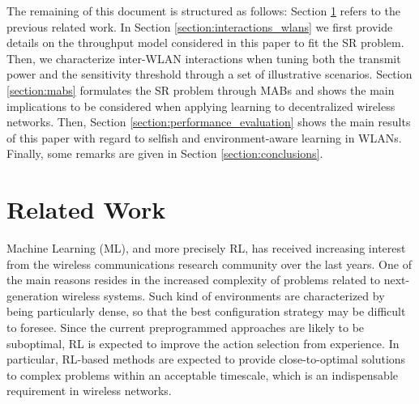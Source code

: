 \documentclass[preprint,12pt]{elsarticle}
\begin{document}
The remaining of this document is structured as follows: Section \ref{section:previous_work} refers to the previous related work. In Section \ref{section:interactions_wlans} we first provide details on the throughput model considered in this paper to fit the SR problem. Then, we characterize inter-WLAN interactions when tuning both the transmit power and the sensitivity threshold through a set of illustrative scenarios. Section \ref{section:mabs} formulates the SR problem through MABs and shows the main implications to be considered when applying learning to decentralized wireless networks. Then, Section \ref{section:performance_evaluation} shows the main results of this paper with regard to selfish and environment-aware learning in WLANs. Finally, some remarks are given in Section \ref{section:conclusions}.

\section{Related Work}
\label{section:previous_work} 		
Machine Learning (ML), and more precisely RL, has received increasing interest from the wireless communications research community over the last years. One of the main reasons resides in the increased complexity of problems related to next-generation wireless systems. Such kind of environments are characterized by being particularly dense, so that the best configuration strategy may be difficult to foresee. Since the current preprogrammed approaches are likely to be suboptimal, RL is expected to improve the action selection from experience. In particular, RL-based methods are expected to provide close-to-optimal solutions to complex problems within an acceptable timescale, which is an indispensable requirement in wireless networks.
\end{document}
